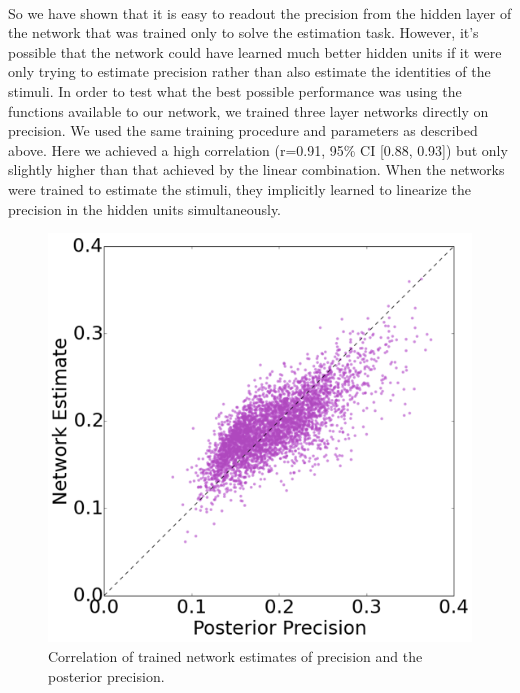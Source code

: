 \documentclass{article} %
\begin{document}
\\
So we have shown that it is easy to readout the precision from the hidden layer of the network that was trained only to solve the estimation task. However, it's possible that the network could have learned much better hidden units if it were only trying to estimate precision rather than also estimate the identities of the stimuli. In order to test what the best possible performance was using the functions available to our network, we trained three layer networks directly on precision. We used the same training procedure and parameters as described above. Here we achieved a high correlation (r=0.91, 95\% CI [0.88, 0.93]) but only slightly higher than that achieved by the linear combination. When the networks were trained to estimate the stimuli, they implicitly learned to linearize the precision in the hidden units simultaneously.
\begin{figure}[h]
\centering
\includegraphics[width = .5\textwidth]{Linear_Fixed_Gains_Precisions.png}
\caption{Correlation of trained network estimates of precision and the posterior precision.}
\end{figure}
\end{document}
